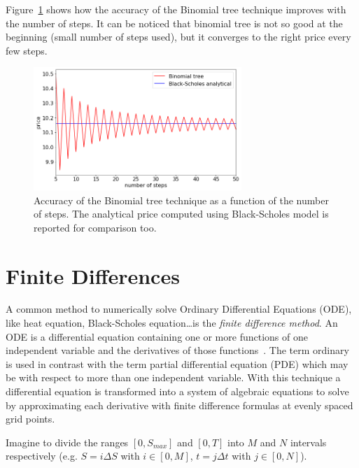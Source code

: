 Figure~\ref{fig:binomial_tree_accuracy} shows how the accuracy of the Binomial tree technique improves with the number of steps.
It can be noticed that binomial tree is not so good at the beginning (small number of steps used), but it converges to the right price every few steps. 

\begin{figure}[htb]
	\centering
	\includegraphics[width=0.7\textwidth]{figures/binomial_tree_accuracy}
	\caption{Accuracy of the Binomial tree technique as a function of the number of steps. The analytical price computed using Black-Scholes model is reported for comparison too.}
	\label{fig:binomial_tree_accuracy}
\end{figure} 

\section{Finite Differences} 
\label{sec:finite_difference}
A common method to numerically solve Ordinary Differential Equations (ODE), like heat equation, Black-Scholes equation\ldots is the \emph{finite difference method}. An ODE is a differential equation containing one or more functions of one independent variable and the derivatives of those functions~\cite{bib:ode}. The term ordinary is used in contrast with the term partial differential equation (PDE) which may be with respect to more than one independent variable.
With this technique a differential equation is transformed into a system of algebraic equations to solve by approximating each derivative with finite difference formulas at evenly spaced grid points.

Imagine to divide the ranges $[0, S_{max}]$ and $[0, T]$ into $M$ and $N$ intervals respectively (e.g. $S = i\Delta S$ with $i\in[0, M]$, $t = j\Delta t$ with $j \in[0,N]$).

